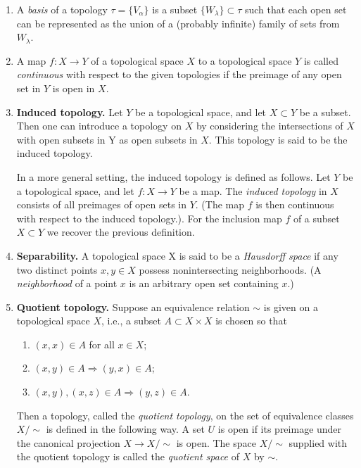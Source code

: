 \documentclass{ctexart}
\begin{document}
\begin{enumerate}
\item A \textit{basis} of a topology $\tau = \{ V_\alpha \}$ is a subset
$\{ W_\lambda \} \subset \tau$ such that each open set can be represented
as the union of a (probably infinite) family of sets from $W_\lambda$.

\item A map $f : X \to Y$ of a topological space $X$ to a topological space
$Y$ is called \textit{continuous} with respect to the given topologies
if the preimage of any open set in $Y$ is open in $X$.

\item \textbf{Induced topology.} Let $Y$ be a topological space, and
  let $X \subset Y$ be a subset. Then one can introduce a topology on
  $X$ by considering the intersections of $X$ with open subsets in Y
  as open subsets in $X$. This topology is said to be the induced
  topology.

In a more general setting, the induced topology is defined as
follows. Let $Y$ be a topological space, and let $f : X \to Y$ be a
map. The \textit{induced topology} in $X$ consists of all preimages of
open sets in $Y$. (The map $f$ is then continuous with respect to the
induced topology.). For the inclusion map $f$ of a subset $X \subset
Y$ we recover the previous definition.

\item \textbf{Separability.} A topological space X is said to be a
  \textit{Hausdorff space} if any two distinct points $x,y \in X$
  possess nonintersecting neighborhoods. (A \textit{neighborhood} of a
  point $x$ is an arbitrary open set containing $x$.)

\item \textbf{Quotient topology.} Suppose an equivalence relation $\sim$ is given on a topological space $X$, i.e., a subset $A \subset X \times X$ is chosen so that
    \begin{adjustwidth}{2em}{}
    \begin{enumerate}
      \item $(x,x) \in A$ for all $x \in X$;
      \item $(x,y) \in A \Rightarrow (y,x) \in A$;
      \item $(x,y), (x,z) \in A \Rightarrow (y,z) \in A$.
    \end{enumerate}
    \end{adjustwidth}
    Then a topology, called the \textit{quotient topology}, on the set of equivalence classes $X/\!\!\sim$ is defined in the following way. A set $U$ is open if its preimage under the canonical projection $X \to X/\!\!\sim$ is open. The space $X/\!\!\sim$ supplied with the quotient topology is called the \textit{quotient space} of $X$ by $\sim$.


\end{enumerate}
\end{document}
